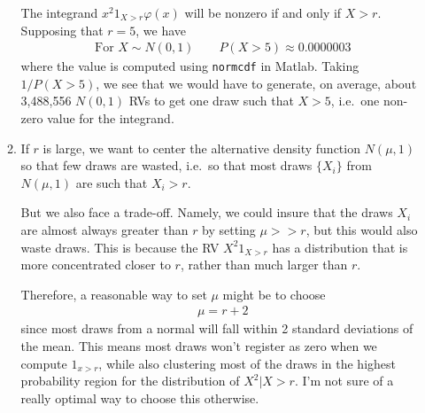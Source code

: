 \documentclass[12pt]{article}
\theoremstyle{plain}
\theoremstyle{definition}
\theoremstyle{remark}
\begin{document}
\begin{enumerate}
\begin{enumerate}
        The integrand $x^2 1_{X>r}\varphi(x)$ will be nonzero if and
        only if $X>r$. Supposing that $r=5$, we have
        \begin{align*}
          \text{For $X\sim N(0,1)$}
          \qquad
          P(X>5) \approx 0.0000003
        \end{align*}
        where the value is computed using \texttt{normcdf} in Matlab.
        Taking $1/P(X>5)$, we see that we would have to generate, on
        average, about 3,488,556 $N(0,1)$ RVs to get one draw such that
        $X>5$, i.e.\ one non-zero value for the integrand.

      \item %
        If $r$ is large, we want to center the alternative density
        function $N(\mu,1)$ so that few draws are wasted, i.e.\ so that
        most draws $\{X_i\}$ from $N(\mu,1)$ are such that $X_i>r$.

        But we also face a trade-off. Namely, we could insure that the
        draws $X_i$ are almost always greater than $r$ by setting
        $\mu>>r$, but this would also waste draws. This is because the
        RV $X^2 1_{X>r}$ has a distribution that is more concentrated
        closer to $r$, rather than much larger than $r$.

        Therefore, a reasonable way to set $\mu$ might be to choose
        \begin{align*}
          \mu = r + 2
        \end{align*}
        since most draws from a normal will fall within 2 standard
        deviations of the mean. This means most draws won't register as
        zero when we compute $1_{x>r}$, while also clustering most of
        the draws in the highest probability region for the distribution
        of $X^2|X>r$. I'm not sure of a really optimal way to choose
        this otherwise.


\end{enumerate}
\end{enumerate}
\end{document}
